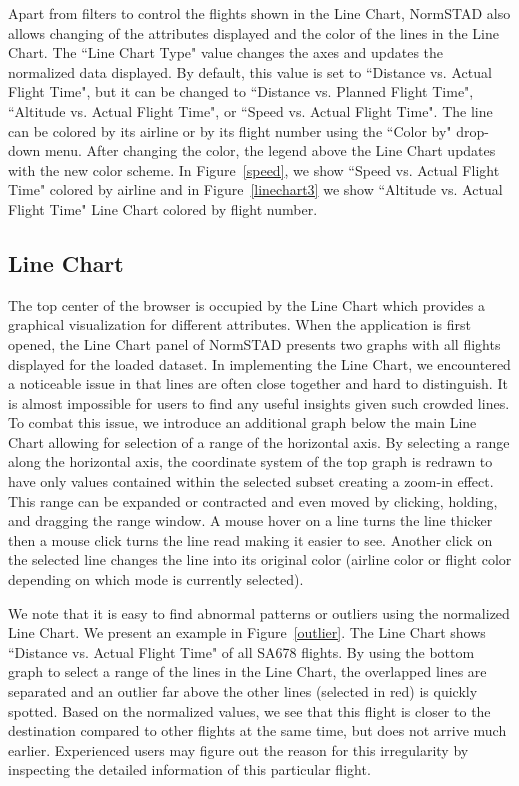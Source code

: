 \documentclass{sig-alternate}
\begin{document}
Apart from filters to control the flights shown in the Line Chart, NormSTAD also allows changing
of the attributes displayed and the color of the lines in the Line Chart. The ``Line Chart Type"
value changes the axes and updates the normalized data displayed. By default, this value
is set to ``Distance vs. Actual Flight Time", but it can be changed to ``Distance
vs. Planned Flight Time", ``Altitude vs. Actual Flight Time", or ``Speed vs. Actual Flight Time". 
The line can be colored by its airline or by its flight number using the ``Color by" drop-down
menu. After changing the color, the legend above the Line Chart updates with the new 
color scheme. In Figure~\ref{speed}, we show ``Speed vs. Actual Flight Time" colored by
airline and in
Figure~\ref{linechart3} we show
``Altitude vs. Actual Flight Time" Line Chart colored by flight number. 

\subsection{Line Chart}
\label{subsec-linechart}
The top center of the browser is occupied by the Line Chart which provides a graphical
visualization for different attributes. When the application is first opened,
the Line Chart panel of NormSTAD presents two graphs with all flights displayed for the loaded
dataset. In implementing the Line Chart, we encountered a noticeable issue in that lines are often
close together and hard to distinguish. It is almost impossible for users to find any useful insights
given such crowded lines. To combat this issue, we introduce an additional graph below the main
Line Chart allowing for selection of a range of the horizontal axis. By selecting a range along 
the horizontal axis, the coordinate system of the top graph is redrawn to have only values contained within
the selected subset creating a zoom-in effect. This range can be expanded or contracted and even moved
by clicking, holding, and dragging the range window. A mouse hover on a line turns the line thicker
then a mouse click turns the line read making it easier to see. Another click on the selected 
line changes the line into its original color (airline color or flight color depending on 
which mode is currently selected). 

We note that it is easy to find abnormal patterns or outliers using the normalized Line Chart. We 
present an example in Figure~\ref{outlier}. The Line Chart shows ``Distance vs. Actual
Flight Time" of all SA678 flights. By using the bottom graph to select a range of the lines 
in the Line Chart, the overlapped lines are separated and an outlier far above the other
lines (selected in red) is quickly spotted. Based on the normalized values, we see that this 
flight is closer to the destination compared to other flights at the same time, but does 
not arrive much earlier. Experienced users may figure out the reason for this irregularity
by inspecting the detailed information of this particular flight. 
\end{document}
